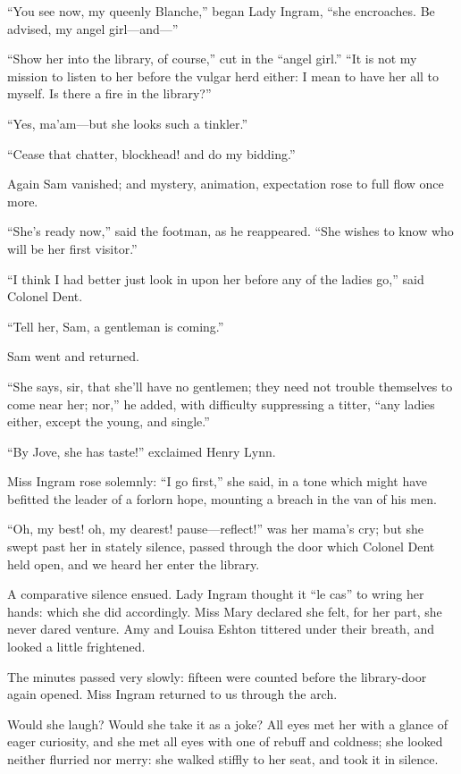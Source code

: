 \enquote{You see now, my queenly Blanche,} began Lady Ingram,
\enquote{she encroaches. Be advised, my angel girl---and---}

\enquote{Show her into the library, of course,} cut in the
\enquote{angel girl.} \enquote{It is not my mission to listen to her
before the vulgar herd either: I mean to have her all to myself. Is
there a fire in the library?}

\enquote{Yes, ma'am---but she looks such a tinkler.}

\enquote{Cease that chatter, blockhead! and do my bidding.}

Again Sam vanished; and mystery, animation, expectation rose to full
flow once more.

\enquote{She's ready now,} said the footman, as he reappeared. 
\enquote{She wishes to know who will be her first visitor.}

\enquote{I think I had better just look in upon her before any of the
ladies go,} said Colonel Dent.

\enquote{Tell her, Sam, a gentleman is coming.}

Sam went and returned.

\enquote{She says, sir, that she'll have no gentlemen; they need not
trouble themselves to come near her; nor,} he added, with difficulty
suppressing a titter, \enquote{any ladies either, except the young, and
single.}

\enquote{By Jove, she has taste!} exclaimed Henry Lynn.

Miss Ingram rose solemnly: \enquote{I go first,} she said, in a tone
which might have befitted the leader of a forlorn hope, mounting a
breach in the van of his men.

\enquote{Oh, my best! oh, my dearest! pause---reflect!} was her mama's
cry; but she swept past her in stately silence, passed through the door
which Colonel Dent held open, and we heard her enter the library.

A comparative silence ensued. Lady Ingram thought it \enquote{le cas}
to wring her hands: which she did accordingly. Miss Mary declared she
felt, for her part, she never dared venture. Amy and Louisa Eshton
tittered under their breath, and looked a little frightened.

The minutes passed very slowly: fifteen were counted before the
library-door again opened. Miss Ingram returned to us through the arch.

Would she laugh? Would she take it as a joke? All eyes met her with a
glance of eager curiosity, and she met all eyes with one of rebuff and
coldness; she looked neither flurried nor merry: she walked stiffly to
her seat, and took it in silence.

